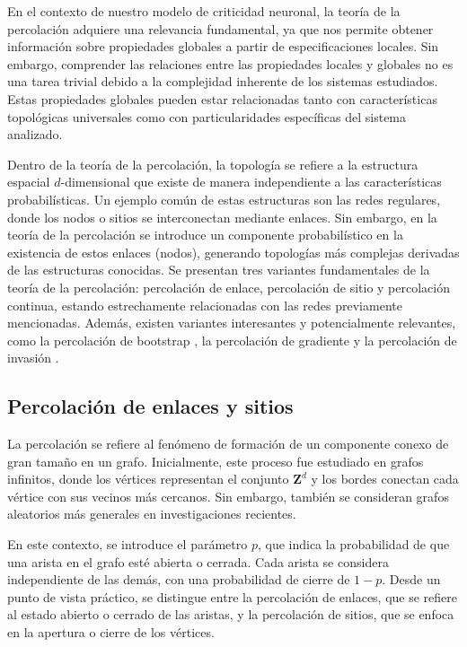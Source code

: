 En el contexto de nuestro modelo de criticidad neuronal, la teoría de la percolación adquiere una relevancia fundamental, ya que nos permite obtener información sobre propiedades globales a partir de especificaciones locales. Sin embargo, comprender las relaciones entre las propiedades locales y globales no es una tarea trivial debido a la complejidad inherente de los sistemas estudiados. Estas propiedades globales pueden estar relacionadas tanto con características topológicas universales como con particularidades específicas del sistema analizado.

Dentro de la teoría de la percolación, la topología se refiere a la estructura espacial $d$-dimensional que existe de manera independiente a las características probabilísticas. Un ejemplo común de estas estructuras son las redes regulares, donde los nodos o sitios se interconectan mediante enlaces. Sin embargo, en la teoría de la percolación se introduce un componente probabilístico en la existencia de estos enlaces (nodos), generando topologías más complejas derivadas de las estructuras conocidas. Se presentan tres variantes fundamentales de la teoría de la percolación: percolación de enlace, percolación de sitio y percolación continua, estando estrechamente relacionadas con las redes previamente mencionadas. Además, existen variantes interesantes y potencialmente relevantes, como la percolación de bootstrap \cite{chalupa_bootstrap_1979}, la percolación de gradiente \cite{rosso_gradient_1986} y la percolación de invasión \cite{chandler_capillary_1982,nickel_invasion_1983,wilkinson_invasion_1983}.


\subsection{Percolación de enlaces y sitios}



La percolación se refiere al fenómeno de formación de un componente conexo de gran tamaño en un grafo. Inicialmente, este proceso fue estudiado en grafos infinitos, donde los vértices representan el conjunto $\mathbf{Z}^d$  y los bordes conectan cada vértice con sus vecinos más cercanos. Sin embargo, también se consideran grafos aleatorios más generales en investigaciones recientes.

En este contexto, se introduce el parámetro $p$, que indica la probabilidad de que una arista en el grafo esté abierta o cerrada. Cada arista se considera independiente de las demás, con una probabilidad de cierre de $1-p$. Desde un punto de vista práctico, se distingue entre la percolación de enlaces, que se refiere al estado abierto o cerrado de las aristas, y la percolación de sitios, que se enfoca en la apertura o cierre de los vértices.

